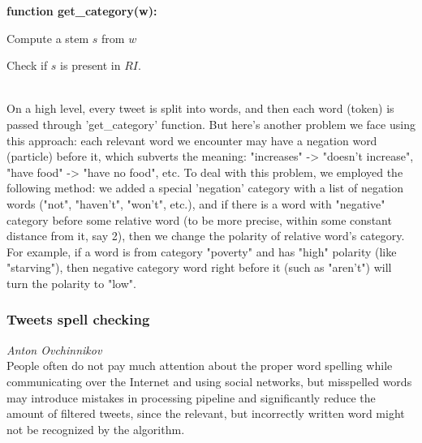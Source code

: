 \textbf{function get\_category(w):}

\indent
\begin{algorithm}[H]
Compute a stem $s$ from $w$ \par
Check if $s$ is present in $RI$.

\end{algorithm}
\noindent \\

On a high level, every tweet is split into words, and then each word (token) is passed through 'get\_category' function. But here's another problem we face using this approach: each relevant word we encounter may have a negation word (particle) before it, which subverts the meaning: "increases" -> "doesn't increase", "have food" -> "have no food", etc. To deal with this problem, we employed the following method: we added a special 'negation' category with a list of negation words ("not", "haven't", "won't", etc.), and if there is a word with "negative" category before some relative word (to be more precise, within some constant distance from it, say 2), then we change the polarity of relative word's category. For example, if a word is from category "poverty" and has "high" polarity (like "starving"), then negative category word right before it (such as "aren't") will turn the polarity to "low".


\subsubsection*{Tweets spell checking}
\emph{Anton Ovchinnikov} \\
People often do not pay much attention about the proper word spelling while communicating over the Internet and using social networks, but misspelled words may introduce mistakes in processing pipeline and significantly reduce the amount of filtered tweets, since the relevant, but incorrectly written word might not be recognized by the algorithm.

